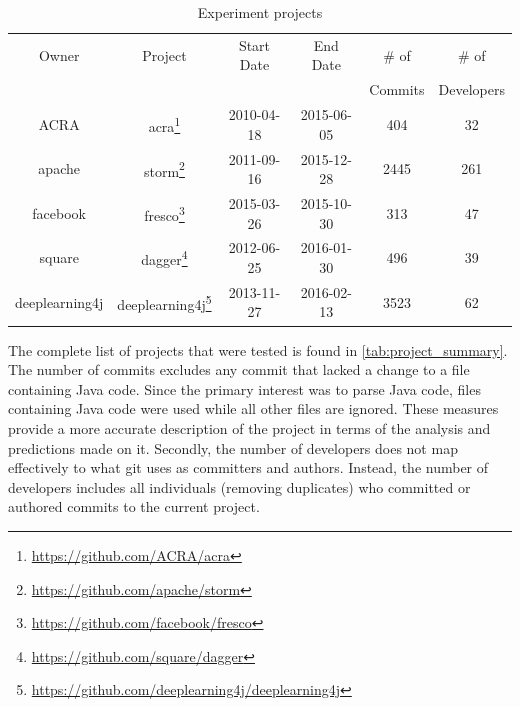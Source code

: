 \begin{table}[!hbp]
\begin{minipage}{\textwidth}
\begin{center}
    \begin{tabular}{|c|c|c|c|c|c|}
        \hline
        Owner & Project & Start Date & End Date & \# of & \# of \\
         & & & & Commits & Developers \\
        \hline
        ACRA & acra\footnote{\url{https://github.com/ACRA/acra}} & 2010-04-18 & 2015-06-05 & 404 & 32 \\
        apache & storm\footnote{\url{https://github.com/apache/storm}} & 2011-09-16 & 2015-12-28 & 2445 & 261 \\
        facebook & fresco\footnote{\url{https://github.com/facebook/fresco}} & 2015-03-26 & 2015-10-30 & 313 & 47 \\
        square & dagger\footnote{\url{https://github.com/square/dagger}} & 2012-06-25 & 2016-01-30 & 496 & 39 \\
        deeplearning4j & deeplearning4j\footnote{\url{https://github.com/deeplearning4j/deeplearning4j}} & 2013-11-27 & 2016-02-13 & 3523 & 62 \\
        \hline
    \end{tabular}
\end{center}
\caption{Experiment projects}
\label{tab:project_summary}
\end{minipage}
\end{table}

The complete list of projects that were tested is found in \autoref{tab:project_summary}. The number of commits excludes any commit that lacked a change to a file containing Java code. Since the primary interest was to parse Java code, files containing Java code were used while all other files are ignored. These measures provide a more accurate description of the project in terms of the analysis and predictions made on it. Secondly, the number of developers does not map effectively to what git uses as committers and authors. Instead, the number of developers includes all individuals (removing duplicates) who committed or authored commits to the current project.

